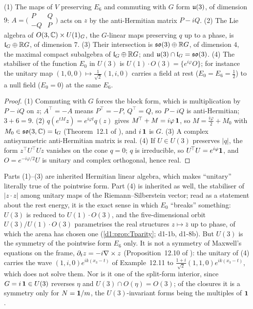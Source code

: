 \begin{proposition}
\label{d1:prop:u3}
(1) The maps of $V$ preserving $E_6$ and commuting with $G$ form $\mathfrak{u}(3)$, of dimension $9$: $A=\bigl(\begin{smallmatrix}P&Q\\-Q&P\end{smallmatrix}\bigr)$
acts on $z$ by the anti-Hermitian matrix $P-iQ$. (2) The Lie algebra of $O(3,\mathbb{C})\times U(1)_G$, the $G$-linear maps preserving $q$ up to a phase, is
$\mathfrak l_G\oplus\mathbb{R} G$, of dimension $7$. (3) Their intersection is $\mathfrak{so}(3)\oplus\mathbb{R} G$, of dimension $4$, the maximal compact subalgebra of $\mathfrak l_G\oplus\mathbb{R} G$; and
$\mathfrak{u}(3)\cap\mathfrak l_G=\mathfrak{so}(3)$. (4) The stabiliser of the function $E_0$ in $U(3)$ is $U(1)\cdot O(3)=\{e^{i\varphi}O\}$; for instance the unitary map
$(1,0,0)\mapsto\tfrac1{\sqrt2}(1,i,0)$ carries a field at rest ($E_0=E_6=\tfrac12$) to a null field ($E_0=0$) at the same $E_6$.
\end{proposition}

\begin{proof}
(1) Commuting with $G$ forces the block form, which is multiplication by $P-iQ$ on $z$; $A^{\!\top}=-A$ means $P^{\!\top}=-P$, $Q^{\!\top}=Q$, so $P-iQ$
is anti-Hermitian; $3+6=9$. (2) $q(e^{tM}z)=e^{i\varphi t}q(z)$ gives $M^{\!\top}+M=i\varphi\,\mathbf 1$, so $M=\tfrac{i\varphi}2+M_0$ with $M_0\in\mathfrak{so}(3,\mathbb{C})=\mathfrak l_G$
(Theorem~12.1 of \cite{ES17}), and $i\,\mathbf 1$ is $G$. (3) A complex antisymmetric anti-Hermitian matrix is real. (4) If $U\in U(3)$ preserves $|q|$, the
form $z^{\!\top}U^{\!\top}Uz$ vanishes on the cone $q=0$; $q$ is irreducible, so $U^{\!\top}U=e^{i\varphi}\mathbf 1$, and $O=e^{-i\varphi/2}U$ is unitary and complex
orthogonal, hence real.
\end{proof}

Parts (1)--(3) are inherited Hermitian linear algebra, which makes ``unitary'' literally true of the pointwise form. Part (4) is inherited as well,
the stabiliser of $|z\cdot z|$ among unitary maps of the Riemann--Silberstein vector; read as a statement about the rest energy, it is the exact
sense in which $E_0$ ``breaks'' something: $U(3)$ is reduced to $U(1)\cdot O(3)$, and the five-dimensional orbit $U(3)/U(1)\cdot O(3)$ parametrises
the real structures $z\mapsto\bar z$ up to phase, of which the arena has chosen one (\cref{d1:prop:Tparity}; d1-1b, d1-8b). But $U(3)$ is the symmetry
of the pointwise form $E_6$ only. It is not a symmetry of Maxwell's equations on the frame, $\partial_tz=-i\nabla\times z$ (Proposition~12.10 of \cite{ES17}):
the unitary of (4) carries the wave $(1,i,0)e^{ik(x_3-t)}$ of Example~12.11 to $\tfrac{1+i}{\sqrt2}(1,1,0)e^{ik(x_3-t)}$, which does not solve them. Nor
is it one of the split-form interior, since $G=i\,\mathbf 1\in U(3)$ reverses $\eta$ and $U(3)\cap O(\eta)=O(3)$; of the closures it is a symmetry only for
$N=\mathbf 1/m$, the $U(3)$-invariant forms being the multiples of $\mathbf 1$.

